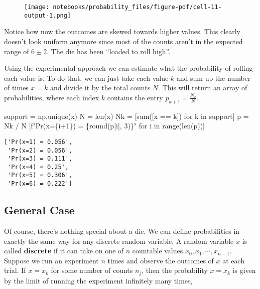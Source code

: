 \documentclass[
  letterpaper,
  DIV=11,
  numbers=noendperiod]{scrreprt}
\newenvironment{Shaded}{\begin{snugshade}}{\end{snugshade}}
\newcommand{\BuiltInTok}[1]{\textcolor[rgb]{0.00,0.23,0.31}{#1}}
\newcommand{\ControlFlowTok}[1]{\textcolor[rgb]{0.00,0.23,0.31}{#1}}
\newcommand{\DecValTok}[1]{\textcolor[rgb]{0.68,0.00,0.00}{#1}}
\newcommand{\KeywordTok}[1]{\textcolor[rgb]{0.00,0.23,0.31}{#1}}
\newcommand{\NormalTok}[1]{\textcolor[rgb]{0.00,0.23,0.31}{#1}}
\newcommand{\OperatorTok}[1]{\textcolor[rgb]{0.37,0.37,0.37}{#1}}
\newcommand{\SpecialCharTok}[1]{\textcolor[rgb]{0.37,0.37,0.37}{#1}}
\newcommand{\SpecialStringTok}[1]{\textcolor[rgb]{0.13,0.47,0.30}{#1}}
\begin{document}
\begin{figure}[H]

{\centering \texttt{[image: notebooks/probability\_files/figure-pdf/cell-11-output-1.png]}

}

\end{figure}

Notice how now the outcomes are skewed towards higher values. This
clearly doesn't look uniform anymore since most of the counts aren't in
the expected range of \(6 \pm 2\). The die has been ``loaded to roll
high''.

Using the experimental approach we can estimate what the probability of
rolling each value is. To do that, we can just take each value \(k\) and
sum up the number of times \(x=k\) and divide it by the total counts
\(N\). This will return an array of probabilities, where each index
\(k\) contains the entry \(p_{k+1} = \frac{N_k}{N}\).

\begin{Shaded}
\begin{Highlighting}[]
\NormalTok{support }\OperatorTok{=}\NormalTok{ np.unique(x)}
\NormalTok{N }\OperatorTok{=} \BuiltInTok{len}\NormalTok{(x)}
\NormalTok{Nk }\OperatorTok{=}\NormalTok{ [}\BuiltInTok{sum}\NormalTok{([x }\OperatorTok{==}\NormalTok{ k]) }\ControlFlowTok{for}\NormalTok{ k }\KeywordTok{in}\NormalTok{ support]}
\NormalTok{p }\OperatorTok{=}\NormalTok{ Nk }\OperatorTok{/}\NormalTok{ N}
\NormalTok{[}\SpecialStringTok{f"Pr(x=}\SpecialCharTok{\{}\NormalTok{i}\OperatorTok{+}\DecValTok{1}\SpecialCharTok{\}}\SpecialStringTok{) = }\SpecialCharTok{\{}\BuiltInTok{round}\NormalTok{(p[i], }\DecValTok{3}\NormalTok{)}\SpecialCharTok{\}}\SpecialStringTok{"} \ControlFlowTok{for}\NormalTok{ i }\KeywordTok{in} \BuiltInTok{range}\NormalTok{(}\BuiltInTok{len}\NormalTok{(p))]}
\end{Highlighting}
\end{Shaded}

\begin{verbatim}
['Pr(x=1) = 0.056',
 'Pr(x=2) = 0.056',
 'Pr(x=3) = 0.111',
 'Pr(x=4) = 0.25',
 'Pr(x=5) = 0.306',
 'Pr(x=6) = 0.222']
\end{verbatim}

\hypertarget{general-case}{%
\subsection{General Case}\label{general-case}}

Of course, there's nothing special about a die. We can define
probabilities in exactly the same way for any discrete random variable.
A random variable \(x\) is called \textbf{discrete} if it can take on
one of \(n\) countable values \(x_0,x_1,\cdots,x_{n-1}\). Suppose we run
an experiment \(n\) times and observe the outcomes of \(x\) at each
trial. If \(x=x_k\) for some number of counts \(n_j\), then the
probability \(x=x_k\) is given by the limit of running the experiment
infinitely many times,
\end{document}

